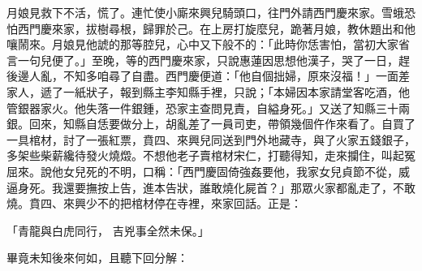 月娘見救下不活，慌了。連忙使小廝來興兒騎頭口，往門外請西門慶來家。雪蛾恐怕西門慶來家，拔樹尋根，歸罪於己。在上房打旋麼兒，跪著月娘，教休題出和他嚷鬧來。月娘見他諕的那等腔兒，心中又下般不的：「此時你恁害怕，當初大家省言一句兒便了。」至晚，等的西門慶來家，只說惠蓮因思想他漢子，哭了一日，趕後邊人亂，不知多咱尋了自盡。西門慶便道：「他自個拙婦，原來沒福！」一面差家人，遞了一紙狀子，報到縣主李知縣手裡，只說；「本婦因本家請堂客吃酒，他管銀器家火。他失落一件銀鍾，恐家主查問見責，自縊身死。」又送了知縣三十兩銀。回來，知縣自恁要做分上，胡亂差了一員司吏，帶領幾個仵作來看了。自買了一具棺材，討了一張紅票，賁四、來興兒同送到門外地藏寺，與了火家五錢銀子，多架些柴薪纔待發火燒燬。不想他老子賣棺材宋仁，打聽得知，走來攔住，叫起冤屈來。說他女兒死的不明，口稱：「西門慶固倚強姦要他，我家女兒貞節不從，威逼身死。我還要撫按上告，進本告狀，誰敢燒化屍首？」那眾火家都亂走了，不敢燒。賁四、來興少不的把棺材停在寺裡，來家回話。正是：

「青龍與白虎同行，  吉兇事全然未保。」

畢竟未知後來何如，且聽下回分解：

